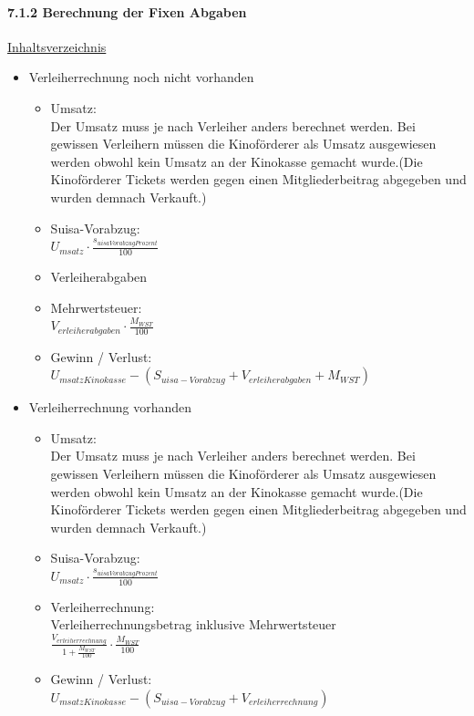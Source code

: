 \documentclass[
]{article}
\providecommand{\tightlist}{%
  \setlength{\itemsep}{0pt}\setlength{\parskip}{0pt}}
\begin{document}
\paragraph{7.1.2 Berechnung der Fixen
Abgaben}\label{berechnung-der-fixen-abgaben}

\hyperref[Inhaltsverzeichnis]{Inhaltsverzeichnis}

\begin{itemize}
\tightlist
\item
  Verleiherrechnung noch nicht vorhanden

  \begin{itemize}
  \tightlist
  \item
    Umsatz:\\
    Der Umsatz muss je nach Verleiher anders berechnet werden. Bei
    gewissen Verleihern müssen die Kinoförderer als Umsatz ausgewiesen
    werden obwohl kein Umsatz an der Kinokasse gemacht wurde.(Die
    Kinoförderer Tickets werden gegen einen Mitgliederbeitrag abgegeben
    und wurden demnach Verkauft.)
  \item
    Suisa-Vorabzug:\\
    \(U_{msatz}\cdot  \frac {s_{uisaVorabzugProzent}}{100}\)
  \item
    Verleiherabgaben\\
  \item
    Mehrwertsteuer:\\
    \(V_{erleiherabgaben}\cdot \frac{M_{WST}}{100}\)
  \item
    Gewinn / Verlust:\\
    \(U_{msatzKinokasse} - (S_{uisa-Vorabzug} + V_{erleiherabgaben} + M_{WST})\)
  \end{itemize}
\item
  Verleiherrechnung vorhanden

  \begin{itemize}
  \tightlist
  \item
    Umsatz:\\
    Der Umsatz muss je nach Verleiher anders berechnet werden. Bei
    gewissen Verleihern müssen die Kinoförderer als Umsatz ausgewiesen
    werden obwohl kein Umsatz an der Kinokasse gemacht wurde.(Die
    Kinoförderer Tickets werden gegen einen Mitgliederbeitrag abgegeben
    und wurden demnach Verkauft.)
  \item
    Suisa-Vorabzug:\\
    \(U_{msatz}\cdot  \frac {s_{uisaVorabzugProzent}}{100}\)
  \item
    Verleiherrechnung:\\
    Verleiherrechnungsbetrag inklusive Mehrwertsteuer\\
    \(\frac {V_{erleiherrechnung}}{1+\frac{M_{WST}}{100}}\cdot\frac{M_{WST}}{100}\)
  \item
    Gewinn / Verlust:\\
    \(U_{msatzKinokasse} - (S_{uisa-Vorabzug} + V_{erleiherrechnung})\)
  \end{itemize}
\end{itemize}
\end{document}
